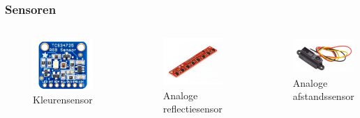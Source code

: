 \documentclass[aspectratio=169,kulak,t]{kulakbeamer} %
\begin{document}
\begin{frame}
	\frametitle{Sensoren}
	\begin{columns}
		\begin{figure}
			\centering
			\includegraphics[width=.7\textwidth]{kleurensensor}
			\caption{Kleurensensor}
		\end{figure}
		\begin{figure}
			\centering
			\includegraphics[width=.8\textwidth]{reflectiesensor}
			\caption{Analoge reflectiesensor}
		\end{figure}
		\begin{figure}
			\centering
			\includegraphics[width=.9\textwidth]{afstandssensor}
			\caption{Analoge afstandssensor}
		\end{figure}
	\end{columns}


\end{frame}
\end{document}
